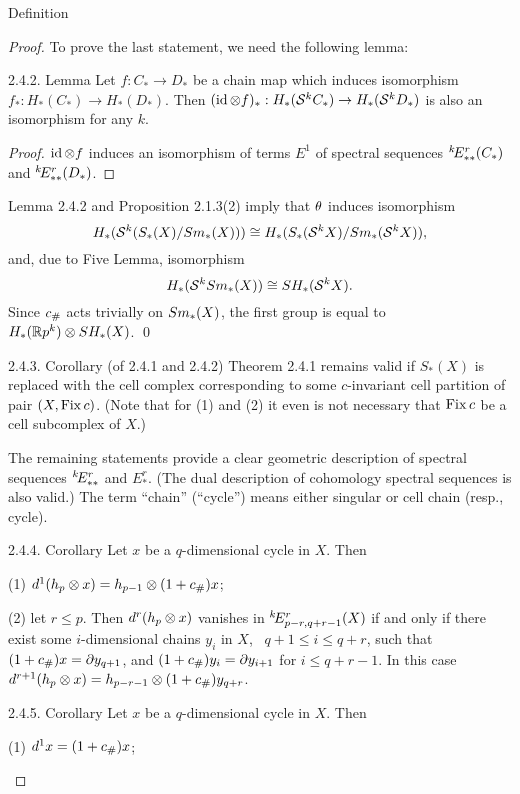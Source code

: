 \documentclass{article}
\begin{document}
\begin{subsubsection}{ Definition}
\begin{proof}
{To prove the last statement, we need the following lemma:
\begin{proclaim}{{2.4.2. Lemma} Let $f:C_*\to D_*$ be a chain map
which induces isomorphism $f_*:H_*(C_*)\to H_*(D_*)$. Then
$(\operatorname{id}\otimes f)_*:H_*(\mathcal S^kC_*)\to H_*(\mathcal S^kD_*)$ is also an
isomorphism for any $k$.
}\end{proclaim}
\begin{proof} $\operatorname{id}\otimes f$ induces an isomorphism of terms $E^1$
of spectral sequences $\E k/r/**/(C_*)$ and $\E k/r/**/(D_*)$. 
\end{proof}
Lemma 2.4.2 and Proposition 2.1.3(2) imply that $\theta$ induces
isomorphism
$$
H_*(\mathcal S^k(S_*(X)/Sm_*(X)))\cong H_*(S_*(\mathcal S^kX)/Sm_*(\mathcal S^kX)),
$$
and, due to Five Lemma, isomorphism
$$
H_*(\mathcal S^kSm_*(X))\cong SH_*(\mathcal S^kX).
$$
Since $c_\#$ acts trivially on $Sm_*(X)$, the first group is equal to
$H_*(\mathbb R p^k)\otimes SH_*(X)$. \qed
\begin{proclaim}{{2.4.3. Corollary \rm (of 2.4.1 and 2.4.2)} Theorem 2.4.1
remains valid if $S_*(X)$ is replaced with the cell complex
corresponding to some $c$-invariant cell partition of pair
$(X,\operatorname{Fix} c)$. (Note that for (1) and (2) it even is not necessary
that $\operatorname{Fix} c$ be a cell subcomplex of $X$.)
}\end{proclaim}
The remaining statements provide a clear geometric description of
spectral sequences $\E k/r/**/$ and $E_*^r$. (The dual description
of cohomology spectral sequences is also valid.) The term ``chain''
(``cycle'') means either singular or cell chain (resp., cycle).
\begin{proclaim}{{2.4.4. Corollary} Let $x$ be a $q$-dimensional cycle in $X$. Then

(1) $d^1(h_p\otimes x)=h_{p-1}\otimes(1+c_\#)x$;

(2) let $r\le p$. Then $d^r(h_p\otimes x)$ vanishes in $\E k/r/p-r,q+r-1/(X)$
if and only if there exist some $i$-dimensional chains $y_i$ in $X$, \
$q+1\le i\le q+r$, such that $(1+c_\#)x=\partial y_{q+1}$,
and $(1+c_\#)y_i=\partial y_{i+1}$ for $i\le q+r-1$. In this case
$d^{r+1}(h_p\otimes x)=h_{p-r-1}\otimes(1+c_\#)y_{q+r}$.
}\end{proclaim}
\begin{proclaim}{{2.4.5. Corollary} Let $x$ be a $q$-dimensional cycle in $X$. Then

(1) $d^1x=(1+c_\#)x$;

}
\end{proclaim}}
\end{proof}
\end{subsubsection}
\end{document}
